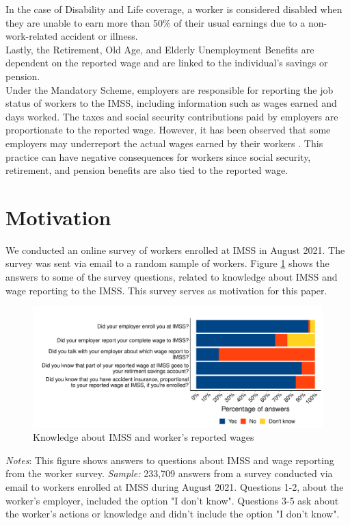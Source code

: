 \documentclass[10pt, oneside]{book}
\begin{document}
In the case of Disability and Life coverage, a worker is considered disabled when they are unable to earn more than 50\% of their usual earnings due to a non-work-related accident or illness. \\

Lastly, the Retirement, Old Age, and Elderly Unemployment Benefits are dependent on the reported wage and are linked to the individual's savings or pension. \\

Under the Mandatory Scheme, employers are responsible for reporting the job status of workers to the IMSS, including information such as wages earned and days worked. The taxes and social security contributions paid by employers are proportionate to the reported wage. However, it has been observed that some employers may underreport the actual wages earned by their workers \citep{kumler2020enlisting}. This practice can have negative consequences for workers since social security, retirement, and pension benefits are also tied to the reported wage. \\


\section{Motivation}

We conducted an online survey of workers enrolled at IMSS in August 2021. The survey was sent via email to a random sample of workers. Figure \ref{fig:hist_knowledge_register_survey} shows the answers to some of the survey questions, related to knowledge about IMSS and wage reporting to the IMSS. This survey serves as motivation for this paper. \\

\begin{figure}[H]
    \centering
    \caption{Knowledge about IMSS and worker's reported wages \label{fig:hist_knowledge_register_survey}}
    \includegraphics[width=\textwidth]{04_Figures/worker_survey/hist_knowledge_register_survey.pdf}
\end{figure}
\scriptsize{\textit{Notes}: This figure shows answers to questions about IMSS and wage reporting from the worker survey. \textit{Sample:} 233,709 answers from a survey conducted via email to workers enrolled at IMSS during August 2021. Questions 1-2, about the worker's employer, included the option "I don't know". Questions 3-5 ask about the worker's actions or knowledge and didn't include the option "I don't know".
} \\
\end{document}
